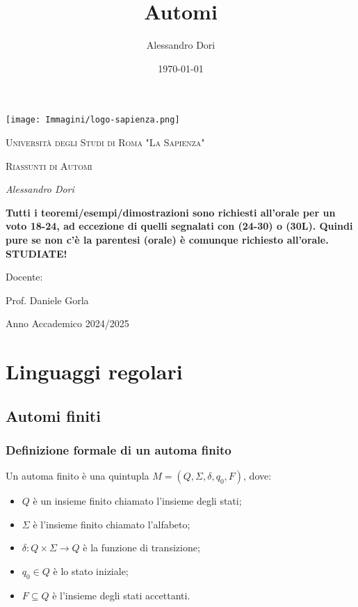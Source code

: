 \documentclass{article}
\title{Automi}
\author{Alessandro Dori}
\date{\today}
\begin{document}
\begin{titlepage}
    \centering
    \vspace*{1in}
    
    \texttt{[image: Immagini/logo-sapienza.png]}\par\vspace{1cm}
    
    {\scshape\LARGE Università degli Studi di Roma "La Sapienza" \par}
    \vspace{1.5cm}
    
    {\scshape\Large Riassunti di Automi\par}
    \vspace{1.5cm}
    
    {\Large\itshape Alessandro Dori\par}
    
    \vspace{3cm}

    \begin{tcolorbox}[colback=red!10!white, colframe=red!50!black, title=ATTENZIONE!]
        \textbf{Tutti i teoremi/esempi/dimostrazioni sono richiesti all'orale per un voto 18-24, ad eccezione di quelli segnalati con (24-30) o (30L). Quindi pure se non c'è la parentesi (orale) è comunque richiesto all'orale. STUDIATE!}
    \end{tcolorbox}
    
    Docente:\par
    {\large Prof. Daniele Gorla\par}
    
    \vfill
    
    {\large Anno Accademico 2024/2025\par}
    
\end{titlepage}

\tableofcontents
\newpage


\section{Linguaggi regolari}
\subsection{Automi finiti}

\subsubsection*{Definizione formale di un automa finito}
Un automa finito è una quintupla $M = (Q, \Sigma, \delta, q_0, F)$, dove:
\begin{itemize}
    \item $Q$ è un insieme finito chiamato l'insieme degli stati;
    \item $\Sigma$ è l'insieme finito chiamato l'alfabeto;
    \item $\delta: Q \times \Sigma \rightarrow Q$ è la funzione di transizione;
    \item $q_0 \in Q$ è lo stato iniziale;
    \item $F \subseteq Q$ è l'insieme degli stati accettanti.
\end{itemize}
\end{document}

